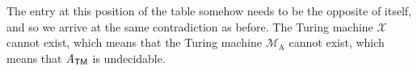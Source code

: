 The entry at this position of the table somehow needs to be the opposite of itself, and so we arrive at the same contradiction as before. The Turing machine $\mathcal{X}$ cannot exist, which means that the Turing machine $\mathcal{M}_{\mathrm{A}}$ cannot exist, which means that $\mathit{A}_{\textsf{TM}}$ is undecidable.